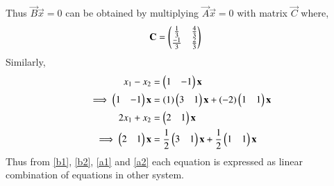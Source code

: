 \documentclass[journal,12pt,twocolumn]{IEEEtran}
\begin{document}
Thus $\vec{B}\vec{x}=0$ can be obtained by multiplying $\vec{A}\vec{x}=0$ with matrix $\vec{C}$ where, 
\begin{align}
    \mathbf{C} &= \begin{pmatrix}\frac{1}{3}&\frac{4}{3} \\ \frac{-1}{3}&\frac{2}{3}\end{pmatrix}
\end{align}
Similarly, 
\begin{align}
    x_1 - x_2 &= \begin{pmatrix}1&-1\end{pmatrix}\mathbf{x} \\
    \implies\begin{pmatrix}1&-1\end{pmatrix}\mathbf{x} &= (1)\begin{pmatrix}3&1\end{pmatrix}\mathbf{x} + (-2)\begin{pmatrix}1&1\end{pmatrix}\mathbf{x} \label{a1}\\
    2x_1 + x_2 &= \begin{pmatrix}2&1\end{pmatrix}\mathbf{x} \\
    \implies \begin{pmatrix}2&1\end{pmatrix}\mathbf{x} &= \frac{1}{2}\begin{pmatrix}3&1\end{pmatrix}\mathbf{x} + \frac{1}{2}\begin{pmatrix}1&1\end{pmatrix}\mathbf{x} \label{a2}
\end{align}
Thus from \eqref{b1}, \eqref{b2}, \eqref{a1} and \eqref{a2} each equation is expressed as linear combination of equations in other system. 
\end{document}
